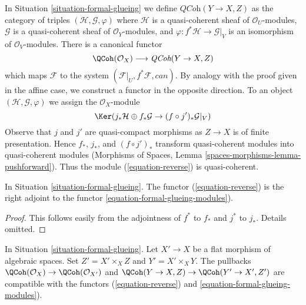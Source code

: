 \noindent
In Situation \ref{situation-formal-glueing} we define
$\textit{QCoh}(Y \to X, Z)$ as the category of
triples $(\mathcal{H}, \mathcal{G}, \varphi)$ where
$\mathcal{H}$ is a quasi-coherent sheaf of
$\mathcal{O}_U$-modules, $\mathcal{G}$ is a quasi-coherent sheaf
of $\mathcal{O}_Y$-modules, and
$\varphi : f^*\mathcal{H} \to \mathcal{G}|_V$ is an isomorphism
of $\mathcal{O}_V$-modules. There is a canonical
functor
\begin{equation}
\label{equation-formal-glueing-modules}
\QCoh(\mathcal{O}_X) \longrightarrow \textit{QCoh}(Y \to X, Z)
\end{equation}
which maps $\mathcal{F}$ to the system
$(\mathcal{F}|_U, f^*\mathcal{F}, can)$.
By analogy with the proof given in the affine case, we construct
a functor in the opposite direction. To an object
$(\mathcal{H}, \mathcal{G}, \varphi)$ we assign the $\mathcal{O}_X$-module
\begin{equation}
\label{equation-reverse}
\Ker(j_*\mathcal{H} \oplus f_*\mathcal{G} \to (f \circ j')_*\mathcal{G}|_V)
\end{equation}
Observe that $j$ and $j'$ are quasi-compact morphisms as
$Z \to X$ is of finite presentation. Hence $f_*$, $j_*$, and $(f \circ j')_*$
transform quasi-coherent modules into quasi-coherent modules
(Morphisms of Spaces, Lemma \ref{spaces-morphisms-lemma-pushforward}).
Thus the module (\ref{equation-reverse}) is quasi-coherent.

\begin{lemma}
\label{lemma-adjoint}
In Situation \ref{situation-formal-glueing}.
The functor (\ref{equation-reverse}) is the right adjoint to
the functor \ref{equation-formal-glueing-modules}).
\end{lemma}

\begin{proof}
This follows easily from the adjointness of $f^*$ to $f_*$
and $j^*$ to $j_*$. Details omitted.
\end{proof}

\begin{lemma}
\label{lemma-reverse-commutes-with-flat-base-change}
In Situation \ref{situation-formal-glueing}.
Let $X' \to X$ be a flat morphism of algebraic spaces.
Set $Z' = X' \times_X Z$ and $Y' = X' \times_X Y$.
The pullbacks $\QCoh(\mathcal{O}_X) \to \QCoh(\mathcal{O}_{X'})$
and $\QCoh(Y \to X, Z) \to \QCoh(Y' \to X', Z')$ are compatible
with the functors (\ref{equation-reverse}) and
\ref{equation-formal-glueing-modules}).
\end{lemma}

